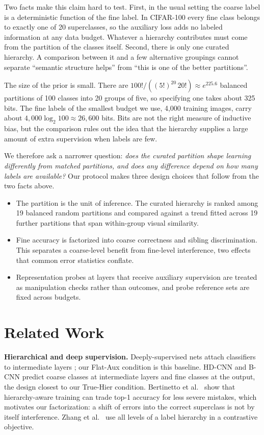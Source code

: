 \documentclass[conference]{IEEEtran}
\begin{document}
Two facts make this claim hard to test. First, in the usual setting the coarse label is a deterministic function of the fine label. In CIFAR-100 \cite{krizhevsky2009cifar} every fine class belongs to exactly one of 20 superclasses, so the auxiliary loss adds no labeled information at any data budget. Whatever a hierarchy contributes must come from the partition of the classes itself. Second, there is only one curated hierarchy. A comparison between it and a few alternative groupings cannot separate ``semantic structure helps'' from ``this is one of the better partitions''.

The size of the prior is small. There are $100!/((5!)^{20}\,20!)\approx e^{225.6}$ balanced partitions of 100 classes into 20 groups of five, so specifying one takes about 325 bits. The fine labels of the smallest budget we use, 4,000 training images, carry about $4{,}000\log_2 100\approx 26{,}600$ bits. Bits are not the right measure of inductive bias, but the comparison rules out the idea that the hierarchy supplies a large amount of extra supervision when labels are few.

We therefore ask a narrower question: \emph{does the curated partition shape learning differently from matched partitions, and does any difference depend on how many labels are available?} Our protocol makes three design choices that follow from the two facts above.
\begin{itemize}
  \item The partition is the unit of inference. The curated hierarchy is ranked among 19 balanced random partitions and compared against a trend fitted across 19 further partitions that span within-group visual similarity.
  \item Fine accuracy is factorized into coarse correctness and sibling discrimination. This separates a coarse-level benefit from fine-level interference, two effects that common error statistics conflate.
  \item Representation probes at layers that receive auxiliary supervision are treated as manipulation checks rather than outcomes, and probe reference sets are fixed across budgets.
\end{itemize}

\section{Related Work}
\textbf{Hierarchical and deep supervision.} Deeply-supervised nets attach classifiers to intermediate layers \cite{lee2015dsn}; our Flat-Aux condition is this baseline. HD-CNN \cite{yan2015hdcnn} and B-CNN \cite{zhu2017bcnn} predict coarse classes at intermediate layers and fine classes at the output, the design closest to our True-Hier condition. Bertinetto et al.\ \cite{bertinetto2020mistakes} show that hierarchy-aware training can trade top-1 accuracy for less severe mistakes, which motivates our factorization: a shift of errors into the correct superclass is not by itself interference. Zhang et al.\ \cite{zhang2022labels} use all levels of a label hierarchy in a contrastive objective.
\end{document}
